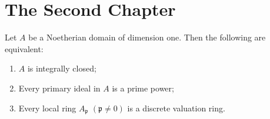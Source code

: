 \chapter{The Second Chapter}
\label{sec:second}

\kant[7-11] %

\begin{theorem}[{\cite[95]{AM69}}]
    \label{thm:dedekind}
    Let \( A \) be a Noetherian domain of dimension one. Then the following are equivalent:
    \begin{enumerate}[\( i) \)]
        \item \( A \) is integrally closed;
        \item Every primary ideal in \( A \) is a prime power;
        \item Every local ring \( A_\mathfrak{p} \) \( (\mathfrak{p} \neq 0) \) is a discrete valuation ring.
    \end{enumerate}
\end{theorem}